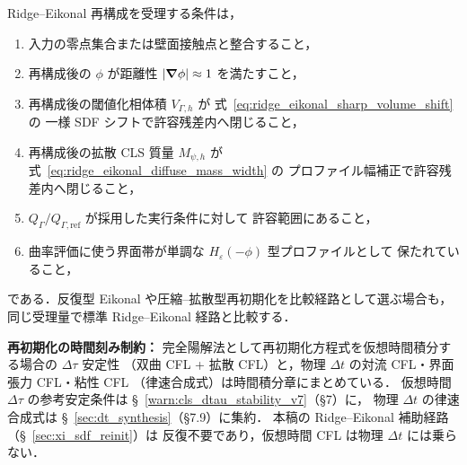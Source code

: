 \begin{tcolorbox}[mybox, title={受理条件：段階 D/F の受理前提}]
Ridge--Eikonal 再構成を受理する条件は，
\begin{enumerate}[noitemsep]
  \item 入力の零点集合または壁面接触点と整合すること，
  \item 再構成後の $\phi$ が距離性 $|\bm{\nabla}\phi|\approx1$ を満たすこと，
  \item 再構成後の閾値化相体積 $V_{\Gamma,h}$ が
        式~\eqref{eq:ridge_eikonal_sharp_volume_shift} の
        一様 SDF シフトで許容残差内へ閉じること，
  \item 再構成後の拡散 CLS 質量 $M_{\psi,h}$ が
        式~\eqref{eq:ridge_eikonal_diffuse_mass_width} の
        プロファイル幅補正で許容残差内へ閉じること，
  \item $Q_\Gamma/Q_{\Gamma,\mathrm{ref}}$ が採用した実行条件に対して
        許容範囲にあること，
  \item 曲率評価に使う界面帯が単調な $H_\varepsilon(-\phi)$ 型プロファイルとして
        保たれていること，
\end{enumerate}
である．反復型 Eikonal や圧縮--拡散型再初期化を比較経路として選ぶ場合も，
同じ受理量で標準 Ridge--Eikonal 経路と比較する．
\end{tcolorbox}

\medskip
\noindent\textbf{再初期化の時間刻み制約：}
完全陽解法として再初期化方程式を仮想時間積分する場合の $\Delta\tau$ 安定性
（双曲 CFL + 拡散 CFL）と，物理 $\Delta t$ の対流 CFL・界面張力 CFL・粘性 CFL
（律速合成式）は時間積分章にまとめている．
仮想時間 $\Delta\tau$ の参考安定条件は \S~\ref{warn:cls_dtau_stability_v7}（§7）に，
物理 $\Delta t$ の律速合成式は \S~\ref{sec:dt_synthesis}（§7.9）に集約．
本稿の Ridge--Eikonal 補助経路（\S~\ref{sec:xi_sdf_reinit}）は
反復不要であり，仮想時間 CFL は物理 $\Delta t$ には乗らない．
